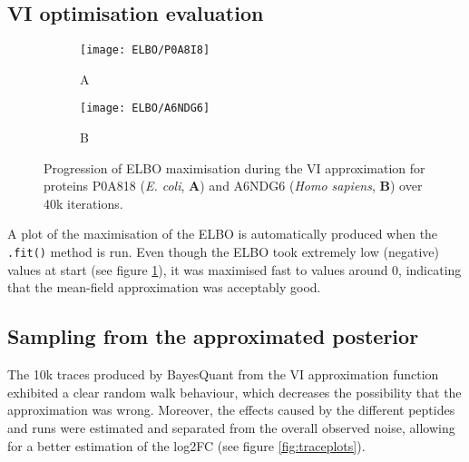 \subsection{VI optimisation evaluation}


\begin{figure}[H]
\begin{subfigure}{.45\textwidth}
\centering
\caption*{A}
\texttt{[image: ELBO/P0A8I8]}
\end{subfigure}
\begin{subfigure}{.45\textwidth}
\centering
\caption*{B}
\texttt{[image: ELBO/A6NDG6]}
\end{subfigure}
\caption[ELBO progression]{Progression of \ac{ELBO} maximisation during the \ac{VI} approximation for proteins P0A818 (\textit{E. coli}, \textbf{A}) and A6NDG6 (\textit{Homo sapiens}, \textbf{B}) over 40k iterations.}
\label{fig:ELBO}
\end{figure}

A plot of the maximisation of the \ac{ELBO} is automatically produced when the \texttt{.fit()} method is run. Even though the ELBO took extremely low (negative) values at start (see figure \ref{fig:ELBO}), it was maximised fast to values around 0, indicating that the mean-field approximation was acceptably good.


\subsection{Sampling from the approximated posterior}
\label{subsec:basic_model}


The 10k traces produced by BayesQuant from the \ac{VI} approximation function exhibited a clear random walk behaviour, which decreases the possibility that the approximation was wrong. Moreover, the  effects caused by the different peptides and runs were estimated and separated from the overall observed noise, allowing for a better estimation of the \ac{log2FC} (see figure \ref{fig:traceplots}).

